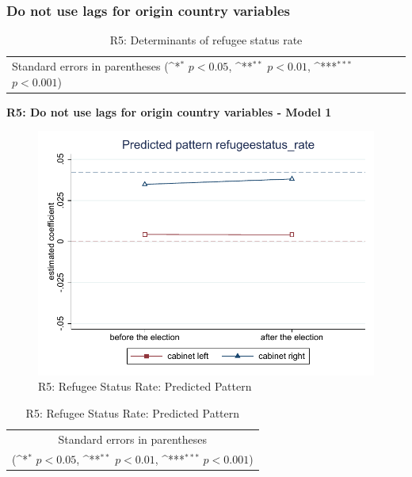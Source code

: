 \documentclass[10pt,a4paper]{scrartcl}
\begin{document}



\clearpage
\FloatBarrier
\subsubsection{Do not use lags for origin country variables}
\begin{table}[!ht]\centering
	\renewcommand{\arraystretch}{1.25}
	\small
	\def\sym#1{\ifmmode^{#1}\else\(^{#1}\)\fi}
	\caption{R5: Determinants of refugee status rate}
	\begin{tabular}{l*{3}{c}}
		\hline\hline
		
		\hline\hline
		\multicolumn{4}{l}{\footnotesize Standard errors in parentheses (\sym{*} \(p<0.05\), \sym{**} \(p<0.01\), \sym{***} \(p<0.001\))}\\
	\end{tabular}
\end{table}

\clearpage
\textbf{R5: Do not use lags for origin country variables - Model 1}
\begin{figure}[!ht]
	\centering
	\includegraphics[width=1\textwidth]{figures_edited/refugeestatus_rate_graph1_R5.pdf}
	\caption{R5: Refugee Status Rate: Predicted Pattern}
\end{figure}

\begin{table}[!ht]\centering
	\renewcommand{\arraystretch}{1.25}
	\def\sym#1{\ifmmode^{#1}\else\(^{#1}\)\fi}
	\caption{R5: Refugee Status Rate: Predicted Pattern}
	\begin{tabular}{l*{2}{c}}
		\hline\hline
		
		\hline\hline
		\multicolumn{3}{c}{\footnotesize Standard errors in parentheses} \\
		\multicolumn{3}{c}{\footnotesize (\sym{*} \(p<0.05\), \sym{**} \(p<0.01\), \sym{***} \(p<0.001\))}\\
	\end{tabular}
\end{table}
\end{document}
